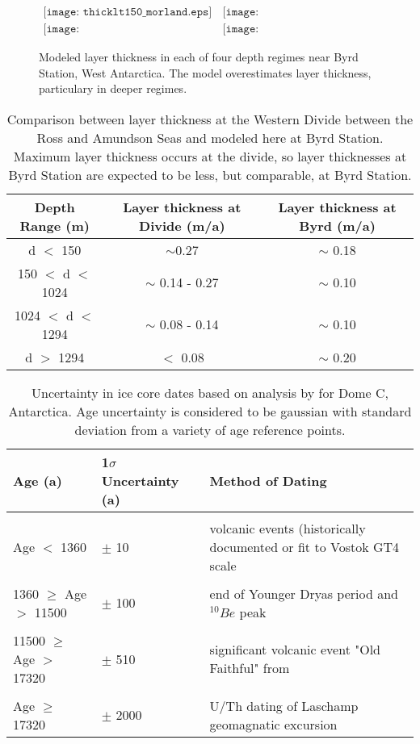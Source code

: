\documentclass[draft,jgrga]{agutex}
\begin{document}
\begin{figure}\label{accum}
\begin{center}$
\begin{array}{cc}
\texttt{[image: thicklt150\_morland.eps]} &
\texttt{[image: thickgt150lt1024\_morland.eps]} \\ \texttt{[image: thickgt1024lt1294\_morland.eps]} &
\texttt{[image: thickgt1294\_morland.eps]}
\end{array}$
\end{center}
\caption{Modeled layer thickness in each of four depth regimes near Byrd Station, West Antarctica. The model overestimates layer thickness, particulary in deeper regimes. }
\end{figure}


\begin{table}\label{accums}
\caption{Comparison between layer thickness at the Western Divide between the Ross and Amundson Seas \citep{neumann2008} and modeled here at Byrd Station. Maximum layer thickness occurs at the divide, so layer thicknesses at Byrd Station are expected to be less, but comparable, at Byrd Station.}
\begin{tabular}{|c|c|c}
\hline
Depth Range (m) & Layer thickness at Divide (m/a) & Layer thickness at Byrd (m/a) \\
\hline
d $<$ 150 & $\sim$0.27 & $\sim$ 0.18 \\
150 $<$ d $<$ 1024 & $\sim$ 0.14 - 0.27 & $\sim$ 0.10\\
1024 $<$ d $<$ 1294 & $\sim$ 0.08 - 0.14 & $\sim$ 0.10\\
d $>$ 1294& $<$ 0.08 & $\sim$ 0.20\\
\hline
\end{tabular}
\end{table}

\begin{table}\label{age_unc}
\caption{Uncertainty in ice core dates based on analysis by \citet{schwander2001} for Dome C, Antarctica. Age uncertainty is considered to be gaussian with standard deviation from a variety of age reference points.}
\begin{tabular}{|p{4cm}|p{4cm}|p{8cm}|}
\hline
 Age (a) & 1$\sigma$ Uncertainty (a) & Method of Dating  \\
\hline
&&\\
Age $<$ 1360 & $\pm$ 10  & volcanic events (historically documented or fit to Vostok GT4 scale \citep{Petit1999}\\
& & \\
1360 $\ge$ Age $>$ 11500 & $\pm$ 100  & end of Younger Dryas period and $^{10}Be$ peak \\
&& \\
11500 $\ge$ Age $>$ 17320 & $\pm$ 510 & significant volcanic event "Old Faithful" from \citet{hammer1994}\\
&&\\
Age $\ge$ 17320 & $\pm$ 2000 & U/Th dating of Laschamp geomagnatic excursion \citep{schramm2000}\\
\hline
\end{tabular}
\end{table}
\end{document}
